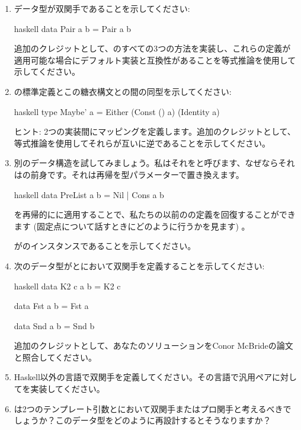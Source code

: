 \begin{enumerate}
  \tightlist
  \item
        データ型が双関手であることを示してください: 

        \begin{snip}{haskell}
data Pair a b = Pair a b
\end{snip}

        追加のクレジットとして、のすべての3つの方法を実装し、これらの定義が適用可能な場合にデフォルト実装と互換性があることを等式推論を使用して示してください。
  \item
        の標準定義とこの糖衣構文との間の同型を示してください: 

        \begin{snip}{haskell}
type Maybe' a = Either (Const () a) (Identity a)
\end{snip}

        ヒント: 2つの実装間にマッピングを定義します。追加のクレジットとして、等式推論を使用してそれらが互いに逆であることを示してください。
  \item
        別のデータ構造を試してみましょう。私はそれをと呼びます、なぜならそれはの前身です。それは再帰を型パラメーターで置き換えます。

        \begin{snip}{haskell}
data PreList a b = Nil | Cons a b
\end{snip}

        を再帰的にに適用することで、私たちの以前のの定義を回復することができます (固定点について話すときにどのように行うかを見ます) 。

        がのインスタンスであることを示してください。
  \item
        次のデータ型がとにおいて双関手を定義することを示してください: 

        \begin{snip}{haskell}
data K2 c a b = K2 c

data Fst a b = Fst a

data Snd a b = Snd b
\end{snip}

        追加のクレジットとして、あなたのソリューションをConor McBrideの論文と照合してください。
  \item
        Haskell以外の言語で双関手を定義してください。その言語で汎用ペアに対してを実装してください。
  \item
        は2つのテンプレート引数とにおいて双関手またはプロ関手と考えるべきでしょうか？このデータ型をどのように再設計するとそうなりますか？
\end{enumerate}
